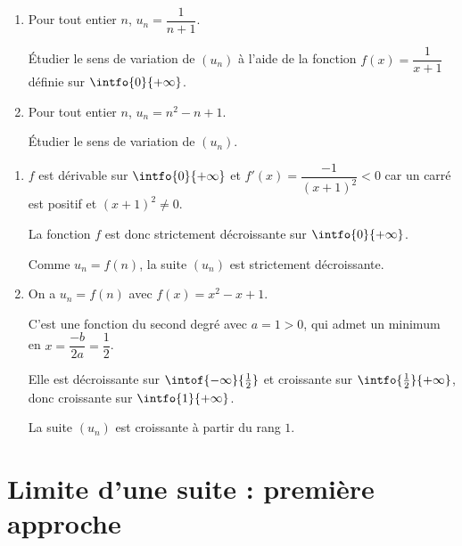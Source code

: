 \begin{methode}
	\nline
	\begin{enumerate}
		\item Pour tout entier $n$, $u_n = \dfrac{1}{n + 1}$.

		      Étudier le sens de variation de $(u_n)$ à l'aide de la fonction $f(x) = \dfrac{1}{x + 1}$ définie sur $\intfo{0}{+\infty}$.
		\item Pour tout entier $n$, $u_n = n^2 - n + 1$.

		      Étudier le sens de variation de $(u_n)$.
	\end{enumerate}

	\begin{correction}
		\nline
		\begin{enumerate}
			\item $f$ est dérivable sur $\intfo{0}{+\infty}$ et $f'(x) = \dfrac{-1}{(x + 1)^2} < 0$ car un carré est positif et $(x + 1)^2 \neq 0$.

			      La fonction $f$ est donc strictement décroissante sur $\intfo{0}{+\infty}$.

			      Comme $u_n = f(n)$, la suite $(u_n)$ est strictement décroissante.

			\item On a $u_n = f(n)$ avec $f(x) = x^2 - x + 1$.

			      C'est une fonction du second degré avec $a = 1 > 0$, qui admet un minimum en $x = \dfrac{-b}{2a} = \dfrac{1}{2}$.

			      Elle est décroissante sur $\intof{-\infty}{\frac{1}{2}}$ et croissante sur $\intfo{\frac{1}{2}}{+\infty}$, donc croissante sur $\intfo{1}{+\infty}$.

			      La suite $(u_n)$ est croissante à partir du rang $1$.
		\end{enumerate}
	\end{correction}
\end{methode}

\newpage

\section{Limite d'une suite : première approche}

